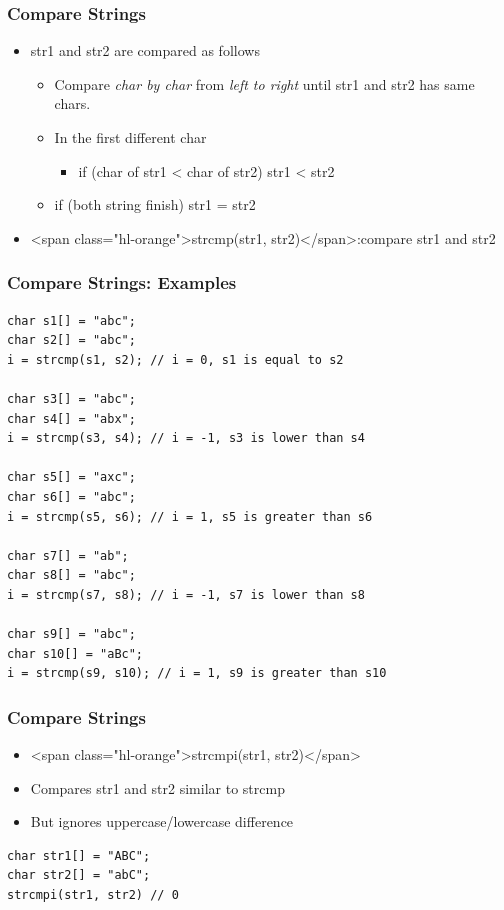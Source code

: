 \documentclass{../c-lecture}
\begin{document}
\begin{frame}
  \frametitle{Compare Strings}
  \begin{itemize}
    \item str1 and str2 are compared as follows
    \begin{itemize}
      \item
        Compare \textit{\color{LimeGreen} char by char} from
        \textit{\color{Cyan} left to right} until str1 and str2 has same
        chars.

      \item In the first different char
      \begin{itemize}
        \item if (char of str1 < char of str2) \textrightarrow str1 < str2
      \end{itemize}
      \item if (both string finish) \textrightarrow str1 = str2
    \end{itemize}
    \item
      <span class="hl-orange">strcmp(str1, str2)</span>:compare str1 and str2
  \end{itemize}
\end{frame}

\begin{frame}[fragile]
  \frametitle{Compare Strings: Examples}
  \begin{verbatim}
char s1[] = "abc";
char s2[] = "abc";
i = strcmp(s1, s2); // i = 0, s1 is equal to s2

char s3[] = "abc";
char s4[] = "abx";
i = strcmp(s3, s4); // i = -1, s3 is lower than s4

char s5[] = "axc";
char s6[] = "abc";
i = strcmp(s5, s6); // i = 1, s5 is greater than s6

char s7[] = "ab";
char s8[] = "abc";
i = strcmp(s7, s8); // i = -1, s7 is lower than s8

char s9[] = "abc";
char s10[] = "aBc";
i = strcmp(s9, s10); // i = 1, s9 is greater than s10
  \end{verbatim}
\end{frame}

\begin{frame}[fragile]
  \frametitle{Compare Strings}
  \begin{itemize}
    \item <span class="hl-orange">strcmpi(str1, str2)</span>
    \item Compares str1 and str2 similar to strcmp
    \item But ignores uppercase/lowercase difference
  \end{itemize}
  \begin{verbatim}
char str1[] = "ABC";
char str2[] = "abC";
strcmpi(str1, str2) // 0
  \end{verbatim}
\end{frame}
\end{document}
